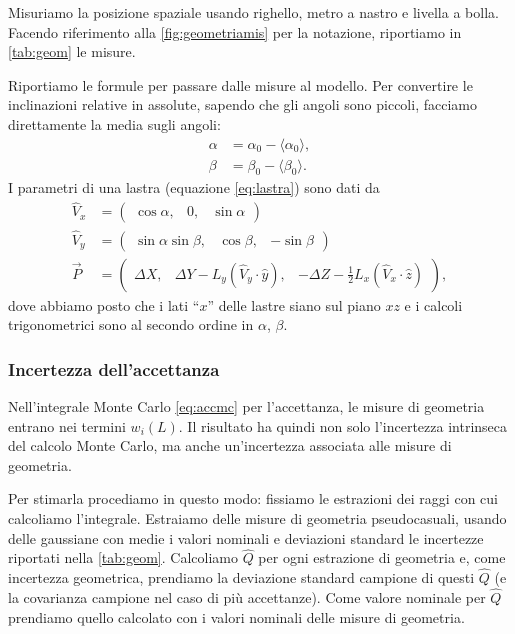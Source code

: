 Misuriamo la posizione spaziale usando righello, metro a nastro e livella a bolla.
Facendo riferimento alla \autoref{fig:geometriamis} per la notazione, riportiamo
in \autoref{tab:geom} le misure.

Riportiamo le formule per passare dalle misure al modello.
Per convertire le inclinazioni relative in assolute,
sapendo che gli angoli sono piccoli, facciamo direttamente la media sugli angoli:
\begin{align*}
	\alpha &= \alpha_0 - \langle\alpha_0\rangle, \\
	\beta  &= \beta_0  - \langle\beta_0\rangle.
\end{align*}
I parametri di una lastra (equazione \ref{eq:lastra}) sono dati da
\begin{align*}
	\hat V_x &= \begin{pmatrix}
		\cos\alpha, & 0, & \sin\alpha
	\end{pmatrix} \\
	\hat V_y &= \begin{pmatrix}
		\sin\alpha\sin\beta, & \cos\beta, & -\sin\beta
	\end{pmatrix} \\
	\vec P &= \begin{pmatrix}
		\Delta X, & \Delta Y - L_y(\hat V_y\cdot\hat y), & -\Delta Z - \frac12 L_x(\hat V_x\cdot\hat z)
	\end{pmatrix},
\end{align*}
dove abbiamo posto che i lati ``$x$'' delle lastre siano sul piano $xz$
e i calcoli trigonometrici sono al secondo ordine in $\alpha$, $\beta$.

\subsubsection{Incertezza dell'accettanza}
\label{sec:uncgeom}

Nell'integrale Monte Carlo \eqref{eq:accmc} per l'accettanza,
le misure di geometria entrano nei termini $w_i(L)$.
Il risultato ha quindi non solo l'incertezza intrinseca del calcolo Monte Carlo,
ma anche un'incertezza associata alle misure di geometria.

Per stimarla procediamo in questo modo:
fissiamo le estrazioni dei raggi con cui calcoliamo l'integrale.
Estraiamo delle misure di geometria pseudocasuali,
usando delle gaussiane con medie i valori nominali e deviazioni standard le incertezze
riportati nella \autoref{tab:geom}.
Calcoliamo $\hat Q$ per ogni estrazione di geometria e, come incertezza geometrica,
prendiamo la deviazione standard campione di questi $\hat Q$
(e la covarianza campione nel caso di più accettanze).
Come valore nominale per $\hat Q$ prendiamo quello calcolato con i valori nominali delle misure di geometria.

